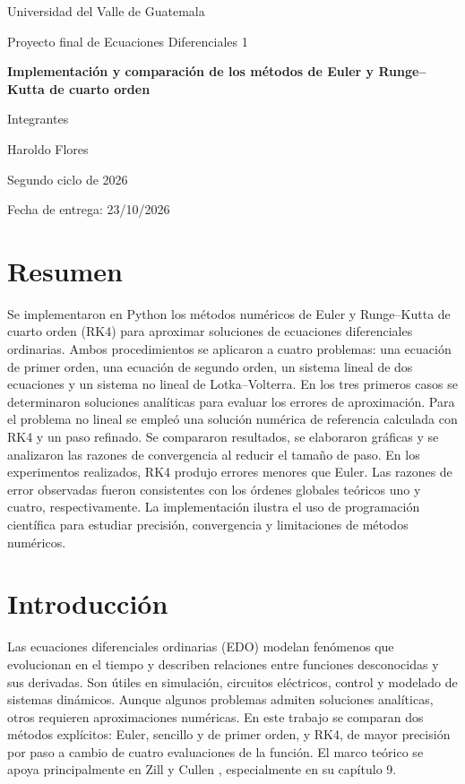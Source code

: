 \documentclass[12pt,letterpaper]{article}
\begin{document}
\begin{titlepage}\centering
{\Large Universidad del Valle de Guatemala\par}\vspace{1.5cm}
{\Large Proyecto final de Ecuaciones Diferenciales 1\par}\vspace{1cm}
{\Huge\bfseries Implementación y comparación de los métodos de Euler y Runge--Kutta de cuarto orden\par}
\vspace{1.5cm}{\large Alternativa 2: resolución numérica de ecuaciones diferenciales ordinarias\par}
\vfill
{\large Integrantes\par}\vspace{0.4cm}
Haroldo Flores
\vfill
{\large Segundo ciclo de 2026\par}
{\large Fecha de entrega: 23/10/2026\par}
\end{titlepage}
\tableofcontents\newpage
\section*{Resumen}
Se implementaron en Python los métodos numéricos de Euler y Runge--Kutta de cuarto orden (RK4) para aproximar soluciones de ecuaciones diferenciales ordinarias. Ambos procedimientos se aplicaron a cuatro problemas: una ecuación de primer orden, una ecuación de segundo orden, un sistema lineal de dos ecuaciones y un sistema no lineal de Lotka--Volterra. En los tres primeros casos se determinaron soluciones analíticas para evaluar los errores de aproximación. Para el problema no lineal se empleó una solución numérica de referencia calculada con RK4 y un paso refinado. Se compararon resultados, se elaboraron gráficas y se analizaron las razones de convergencia al reducir el tamaño de paso. En los experimentos realizados, RK4 produjo errores menores que Euler. Las razones de error observadas fueron consistentes con los órdenes globales teóricos uno y cuatro, respectivamente. La implementación ilustra el uso de programación científica para estudiar precisión, convergencia y limitaciones de métodos numéricos.
\newpage
\section{Introducción}
Las ecuaciones diferenciales ordinarias (EDO) modelan fenómenos que evolucionan en el tiempo y describen relaciones entre funciones desconocidas y sus derivadas. Son útiles en simulación, circuitos eléctricos, control y modelado de sistemas dinámicos. Aunque algunos problemas admiten soluciones analíticas, otros requieren aproximaciones numéricas. En este trabajo se comparan dos métodos explícitos: Euler, sencillo y de primer orden, y RK4, de mayor precisión por paso a cambio de cuatro evaluaciones de la función. El marco teórico se apoya principalmente en Zill y Cullen \cite{zill2009}, especialmente en su capítulo 9.
\end{document}
